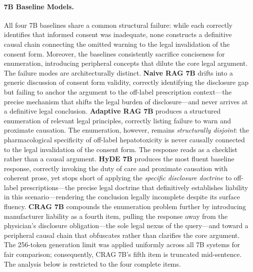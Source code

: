 \documentclass[a4paper,fleql]{cas-sc}
\begin{document}
\paragraph{7B Baseline Models.}
All four 7B baselines share a common structural failure: while each correctly
identifies that informed consent was inadequate, none constructs a definitive
causal chain connecting the omitted warning to the legal invalidation of the
consent form. Moreover, the baselines consistently sacrifice conciseness for
enumeration, introducing peripheral concepts that dilute the core legal
argument. The failure modes are architecturally distinct.
\textbf{Naive RAG 7B} drifts into a generic discussion of consent form
validity, correctly identifying the disclosure gap but failing to anchor the
argument to the off-label prescription context---the precise mechanism that
shifts the legal burden of disclosure---and never arrives at a definitive legal
conclusion.
\textbf{Adaptive RAG 7B} produces a structured enumeration of relevant legal
principles, correctly listing failure to warn and proximate causation.
The enumeration, however, remains \emph{structurally disjoint}: the
pharmacological specificity of off-label hepatotoxicity is never causally
connected to the legal invalidation of the consent form. The response reads
as a checklist rather than a causal argument.
\textbf{HyDE 7B} produces the most fluent baseline response, correctly
invoking the duty of care and proximate causation with coherent prose, yet
stops short of applying the \textit{specific disclosure doctrine} to off-label
prescriptions---the precise legal doctrine that definitively establishes
liability in this scenario---rendering the conclusion legally incomplete despite
its surface fluency.
\textbf{CRAG 7B} compounds the enumeration problem further by introducing
manufacturer liability as a fourth item, pulling the response away from the
physician's disclosure obligation---the sole legal nexus of the query---and
toward a peripheral causal chain that obfuscates rather than clarifies the
core argument. The 256-token generation limit was applied uniformly across all 7B systems
for fair comparison; consequently, CRAG 7B's fifth item is truncated
mid-sentence. The analysis below is restricted to the four complete items.
\end{document}
